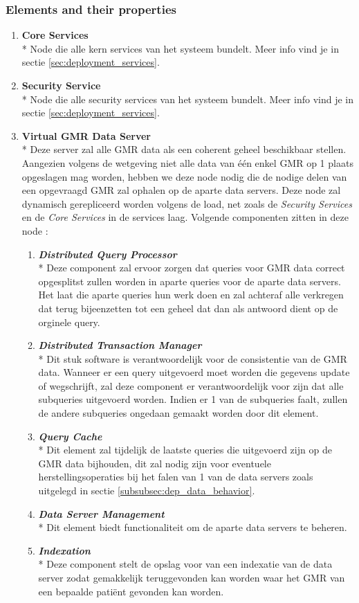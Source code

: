 \documentclass[a4paper,10pt]{article}
\begin{document}
\subsubsection{Elements and their properties}
\begin{enumerate}
 \item \textbf{Core Services}\\*
Node die alle kern services van het systeem bundelt. Meer info vind je in sectie \ref{sec:deployment_services}.
\item \textbf{Security Service}\\*
Node die alle security services van het systeem bundelt. Meer info vind je in sectie \ref{sec:deployment_services}.
\item \textbf{Virtual GMR Data Server}\\*
Deze server zal alle GMR data als een coherent geheel beschikbaar stellen. Aangezien volgens de wetgeving niet alle data van één enkel GMR op 1 plaats opgeslagen mag worden, hebben we deze node nodig die de nodige delen van een opgevraagd GMR zal ophalen op de aparte data servers. Deze node zal dynamisch gerepliceerd worden volgens de load, net zoals de \textit{Security Services} en de \textit{Core Services} in de services laag. Volgende componenten zitten in deze node : 
\begin{enumerate}
 \item \textit{\textbf{Distributed Query Processor}}\\*
Deze component zal ervoor zorgen dat queries voor GMR data correct opgesplitst zullen worden in aparte queries voor de aparte data servers. Het laat die aparte queries hun werk doen en zal achteraf alle verkregen dat terug bijeenzetten tot een geheel dat dan als antwoord dient op de orginele query.
\item \textit{\textbf{Distributed Transaction Manager}}\\*
Dit stuk software is verantwoordelijk voor de consistentie van de GMR data. Wanneer er een query uitgevoerd moet worden die gegevens update of wegschrijft, zal deze component er verantwoordelijk voor zijn dat alle subqueries uitgevoerd worden. Indien er 1 van de subqueries faalt, zullen de andere subqueries ongedaan gemaakt worden door dit element.
\item \textit{\textbf{Query Cache}}\\*
Dit element zal tijdelijk de laatste queries die uitgevoerd zijn op de GMR data bijhouden, dit zal nodig zijn voor eventuele herstellingsoperaties bij het falen van 1 van de data servers zoals uitgelegd in sectie \ref{subsubsec:dep_data_behavior}.
\item \textit{\textbf{Data Server Management}}\\*
Dit element biedt functionaliteit om de aparte data servers te beheren.
\item \textit{\textbf{Indexation}}\\*
Deze component stelt de opslag voor van een indexatie van de data server zodat gemakkelijk teruggevonden kan worden waar het GMR van een bepaalde patiënt gevonden kan worden.
\end{enumerate}


\end{enumerate}
\end{document}
